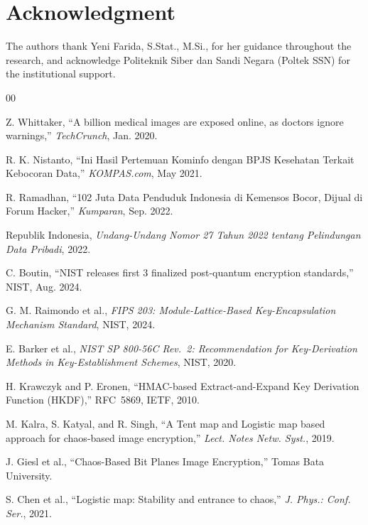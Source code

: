 \documentclass[conference]{IEEEtran}
\begin{document}
\section*{Acknowledgment}

The authors thank Yeni Farida, S.Stat., M.Si., for her guidance throughout the research, and acknowledge Politeknik Siber dan Sandi Negara (Poltek SSN) for the institutional support.

\begin{thebibliography}{00}

	Z. Whittaker, ``A billion medical images are exposed online, as doctors ignore warnings,'' \textit{TechCrunch}, Jan. 2020.

	R. K. Nistanto, ``Ini Hasil Pertemuan Kominfo dengan BPJS Kesehatan Terkait Kebocoran Data,'' \textit{KOMPAS.com}, May 2021.

	R. Ramadhan, ``102 Juta Data Penduduk Indonesia di Kemensos Bocor, Dijual di Forum Hacker,'' \textit{Kumparan}, Sep. 2022.

	Republik Indonesia, \textit{Undang-Undang Nomor 27 Tahun 2022 tentang Pelindungan Data Pribadi}, 2022.

	C. Boutin, ``NIST releases first 3 finalized post-quantum encryption standards,'' NIST, Aug. 2024.

	G. M. Raimondo et al., \textit{FIPS 203: Module-Lattice-Based Key-Encapsulation Mechanism Standard}, NIST, 2024.

	E. Barker et al., \textit{NIST SP 800-56C Rev.~2: Recommendation for Key-Derivation Methods in Key-Establishment Schemes}, NIST, 2020.

	H. Krawczyk and P. Eronen, ``HMAC-based Extract-and-Expand Key Derivation Function (HKDF),'' RFC~5869, IETF, 2010.

	M. Kalra, S. Katyal, and R. Singh, ``A Tent map and Logistic map based approach for chaos-based image encryption,'' \textit{Lect. Notes Netw. Syst.}, 2019.

	J. Giesl et al., ``Chaos-Based Bit Planes Image Encryption,'' Tomas Bata University.

	S. Chen et al., ``Logistic map: Stability and entrance to chaos,'' \textit{J. Phys.: Conf. Ser.}, 2021.


\end{thebibliography}
\end{document}
